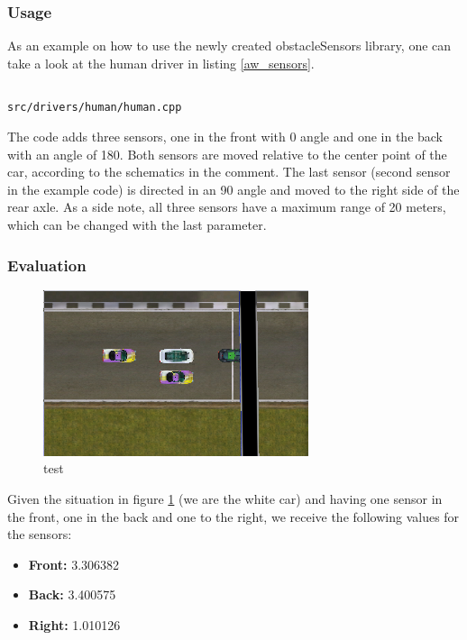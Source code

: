 \documentclass[paper=a4, fontsize=11pt]{scrreprt}
\begin{document}
\subsubsection{Usage}
As an example on how to use the newly created obstacleSensors library,
one can take a look at the human driver in listing \ref{aw_sensors}.

\begin{listing}[ht]
  \inputminted[firstline=245,linenos=true,lastline=256,gobble=4]{c++}{../../../simulators/speed-dreams/src/drivers/human/human.cpp}
  \caption{\texttt{src/drivers/human/human.cpp}}\label{aw_sensors}
\end{listing}

The code adds three sensors, one in the front with 0\degree{} angle
and one in the back with an angle of 180\degree{}.
Both sensors are moved relative to the center point of the car,
according to the schematics in the comment.
The last sensor (second sensor in the example code) is directed in an 90\degree{} angle
and moved to the right side of the rear axle.
As a side note, all three sensors have a maximum range of 20 meters,
which can be changed with the last parameter.

\subsubsection{Evaluation}
\begin{figure}
  \begin{center}
  \includegraphics[scale=0.5]{aw_imgs/parked.png}
\end{center}
\caption{test}\label{aw_parked_img}
\end{figure}

Given the situation in figure \ref{aw_parked_img}
(we are the white car) and having one sensor in the front,
one in the back and one to the right,
we receive the following values for the sensors:
\begin{itemize}
  \item \textbf{Front:} 3.306382
  \item \textbf{Back:} 3.400575
  \item \textbf{Right:} 1.010126
\end{itemize}
\end{document}
